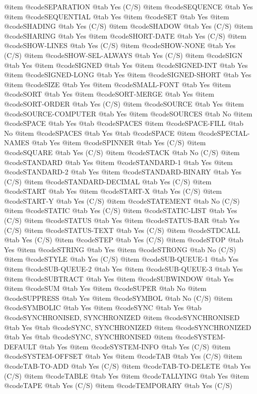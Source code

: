 @item @code{SEPARATION} @tab Yes (C/S)
@item @code{SEQUENCE} @tab Yes
@item @code{SEQUENTIAL} @tab Yes
@item @code{SET} @tab Yes
@item @code{SHADING} @tab Yes (C/S)
@item @code{SHADOW} @tab Yes (C/S)
@item @code{SHARING} @tab Yes
@item @code{SHORT-DATE} @tab Yes (C/S)
@item @code{SHOW-LINES} @tab Yes (C/S)
@item @code{SHOW-NONE} @tab Yes (C/S)
@item @code{SHOW-SEL-ALWAYS} @tab Yes (C/S)
@item @code{SIGN} @tab Yes
@item @code{SIGNED} @tab Yes
@item @code{SIGNED-INT} @tab Yes
@item @code{SIGNED-LONG} @tab Yes
@item @code{SIGNED-SHORT} @tab Yes
@item @code{SIZE} @tab Yes
@item @code{SMALL-FONT} @tab Yes
@item @code{SORT} @tab Yes
@item @code{SORT-MERGE} @tab Yes
@item @code{SORT-ORDER} @tab Yes (C/S)
@item @code{SOURCE} @tab Yes
@item @code{SOURCE-COMPUTER} @tab Yes
@item @code{SOURCES} @tab No
@item @code{SPACE} @tab Yes @tab @code{SPACES}
@item @code{SPACE-FILL} @tab No
@item @code{SPACES} @tab Yes @tab @code{SPACE}
@item @code{SPECIAL-NAMES} @tab Yes
@item @code{SPINNER} @tab Yes (C/S)
@item @code{SQUARE} @tab Yes (C/S)
@item @code{STACK} @tab No (C/S)
@item @code{STANDARD} @tab Yes
@item @code{STANDARD-1} @tab Yes
@item @code{STANDARD-2} @tab Yes
@item @code{STANDARD-BINARY} @tab Yes (C/S)
@item @code{STANDARD-DECIMAL} @tab Yes (C/S)
@item @code{START} @tab Yes
@item @code{START-X} @tab Yes (C/S)
@item @code{START-Y} @tab Yes (C/S)
@item @code{STATEMENT} @tab No (C/S)
@item @code{STATIC} @tab Yes (C/S)
@item @code{STATIC-LIST} @tab Yes (C/S)
@item @code{STATUS} @tab Yes
@item @code{STATUS-BAR} @tab Yes (C/S)
@item @code{STATUS-TEXT} @tab Yes (C/S)
@item @code{STDCALL} @tab Yes (C/S)
@item @code{STEP} @tab Yes (C/S)
@item @code{STOP} @tab Yes
@item @code{STRING} @tab Yes
@item @code{STRONG} @tab No (C/S)
@item @code{STYLE} @tab Yes (C/S)
@item @code{SUB-QUEUE-1} @tab Yes
@item @code{SUB-QUEUE-2} @tab Yes
@item @code{SUB-QUEUE-3} @tab Yes
@item @code{SUBTRACT} @tab Yes
@item @code{SUBWINDOW} @tab Yes
@item @code{SUM} @tab Yes
@item @code{SUPER} @tab No
@item @code{SUPPRESS} @tab Yes
@item @code{SYMBOL} @tab No (C/S)
@item @code{SYMBOLIC} @tab Yes
@item @code{SYNC} @tab Yes @tab @code{SYNCHRONISED, SYNCHRONIZED}
@item @code{SYNCHRONISED} @tab Yes @tab @code{SYNC, SYNCHRONIZED}
@item @code{SYNCHRONIZED} @tab Yes @tab @code{SYNC, SYNCHRONISED}
@item @code{SYSTEM-DEFAULT} @tab Yes
@item @code{SYSTEM-INFO} @tab Yes (C/S)
@item @code{SYSTEM-OFFSET} @tab Yes
@item @code{TAB} @tab Yes (C/S)
@item @code{TAB-TO-ADD} @tab Yes (C/S)
@item @code{TAB-TO-DELETE} @tab Yes (C/S)
@item @code{TABLE} @tab Yes
@item @code{TALLYING} @tab Yes
@item @code{TAPE} @tab Yes (C/S)
@item @code{TEMPORARY} @tab Yes (C/S)
